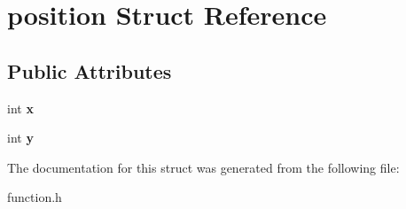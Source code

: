\hypertarget{structposition}{}\section{position Struct Reference}
\label{structposition}
\subsection*{Public Attributes}
\begin{DoxyCompactItemize}
\item 
\mbox{\label{structposition_aad0117268685890818989a6c0112ab8a}} 
int {\bfseries x}
\item 
\mbox{\label{structposition_ab7163210f8aa5e8dc68ef434a315792c}} 
int {\bfseries y}
\end{DoxyCompactItemize}


The documentation for this struct was generated from the following file\+:\begin{DoxyCompactItemize}
\item 
function.\+h\end{DoxyCompactItemize}
